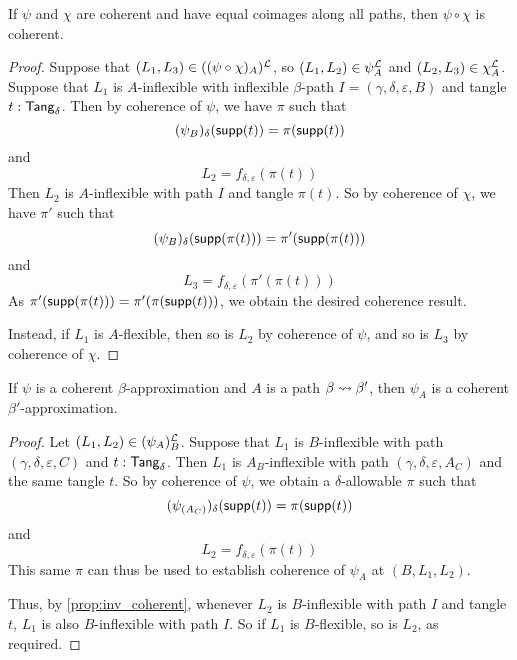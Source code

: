 \begin{proposition}
  \label{prop:Coherent.comp}
  If \( \psi \) and \( \chi \) are coherent and have equal coimages along all paths, then \( \psi \circ \chi \) is coherent.
\end{proposition}
\begin{proof}
  Suppose that \( (L_1, L_3) \in ((\psi \circ \chi)_A)^{\mathcal L} \), so \( (L_1, L_2) \in \psi_A^{\mathcal L} \) and \( (L_2, L_3) \in \chi_A^{\mathcal L} \).
  Suppose that \( L_1 \) is \( A \)-inflexible with inflexible \( \beta \)-path \( I = (\gamma, \delta, \varepsilon, B) \) and tangle \( t : \mathsf{Tang}_\delta \).
  Then by coherence of \( \psi \), we have \( \pi \) such that
  \[ (\psi_B)_\delta(\operatorname{\mathsf{supp}}(t)) = \pi(\operatorname{\mathsf{supp}}(t)) \]
  and
  \[ L_2 = f_{\delta,\varepsilon}(\pi(t)) \]
  Then \( L_2 \) is \( A \)-inflexible with path \( I \) and tangle \( \pi(t) \).
  So by coherence of \( \chi \), we have \( \pi' \) such that
  \[ (\psi_B)_\delta(\operatorname{\mathsf{supp}}(\pi(t))) = \pi'(\operatorname{\mathsf{supp}}(\pi(t))) \]
  and
  \[ L_3 = f_{\delta,\varepsilon}(\pi'(\pi(t))) \]
  As \( \pi'(\operatorname{\mathsf{supp}}(\pi(t))) = \pi'(\pi(\operatorname{\mathsf{supp}}(t))) \), we obtain the desired coherence result.

  Instead, if \( L_1 \) is \( A \)-flexible, then so is \( L_2 \) by coherence of \( \psi \), and so is \( L_3 \) by coherence of \( \chi \).
\end{proof}
\begin{proposition}
  \label{prop:Coherent.deriv}
  If \( \psi \) is a coherent \( \beta \)-approximation and \( A \) is a path \( \beta \rightsquigarrow \beta' \), then \( \psi_A \) is a coherent \( \beta' \)-approximation.
\end{proposition}
\begin{proof}
  Let \( (L_1, L_2) \in (\psi_A)_B^{\mathcal L} \).
  Suppose that \( L_1 \) is \( B \)-inflexible with path \( (\gamma, \delta, \varepsilon, C) \) and \( t : \mathsf{Tang}_\delta \).
  Then \( L_1 \) is \( A_B \)-inflexible with path \( (\gamma, \delta, \varepsilon, A_C) \) and the same tangle \( t \).
  So by coherence of \( \psi \), we obtain a \( \delta \)-allowable \( \pi \) such that
  \[ (\psi_{(A_C)})_\delta(\operatorname{\mathsf{supp}}(t)) = \pi(\operatorname{\mathsf{supp}}(t)) \]
  and
  \[ L_2 = f_{\delta,\varepsilon}(\pi(t)) \]
  This same \( \pi \) can thus be used to establish coherence of \( \psi_A \) at \( (B, L_1, L_2) \).

  Thus, by \cref{prop:inv_coherent}, whenever \( L_2 \) is \( B \)-inflexible with path \( I \) and tangle \( t \), \( L_1 \) is also \( B \)-inflexible with path \( I \).
  So if \( L_1 \) is \( B \)-flexible, so is \( L_2 \), as required.
\end{proof}

